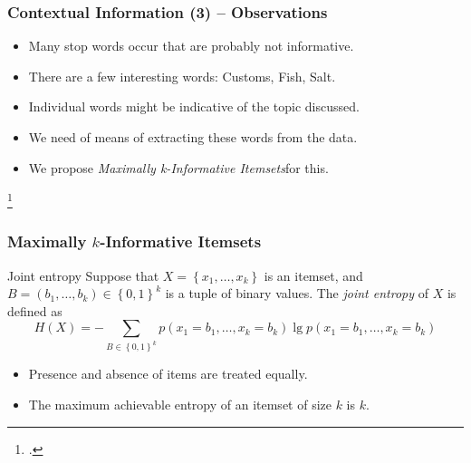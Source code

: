 \documentclass[12pt]{beamer}
\theoremstyle{break}
\begin{document}


\begin{frame}
	\frametitle{Contextual Information (3) -- Observations}

	\begin{itemize}
		\item Many \alert{stop words} occur that are probably not informative.
		\item There are a few interesting words: Customs, Fish, Salt.
		\item Individual words might be indicative of the \alert{topic} discussed.
		\item We need of means of extracting these words from the data.
		\item We propose \emph{Maximally k-Informative Itemsets}\footnotemark for this.
	\end{itemize}
	
	\footcitetext{Knobbe2006}
	
\end{frame}




\begin{frame}
	\frametitle{Maximally $k$-Informative Itemsets}
	
	\begin{block}{Joint entropy}
    	Suppose that $X = \left\{ x_{1}, \dots, x_{k} \right\}$ is an itemset, and $B = \left( b_{1}, \dots, b_{k} \right) \in \left\{ 0, 1 \right\}^{k}$ is a tuple of binary values. The \emph{joint entropy} of $X$ is defined as
    	\small
    	\begin{equation*}
        	H(X) = -\sum_{B \in \left\{ 0, 1 \right\}^{k}} p \left( x_{1} = b_{1}, \dots, x_{k} = b_{k} \right) \lg p \left( x_{1} = b_{1}, \dots, x_{k} = b_{k} \right)
    	\end{equation*}
    	\normalsize
	\end{block}
	
	\pause
	
	\begin{itemize}
		\item Presence and absence of items are treated equally.
		\item The maximum achievable entropy of an itemset of size $k$ is $k$.
	\end{itemize}

\end{frame}


\end{document}
